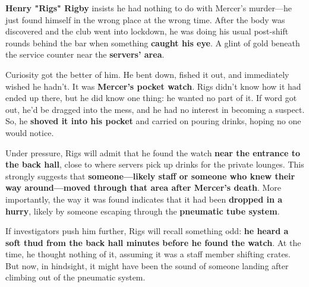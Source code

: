 \begin{WyrdExplanation}
	\textbf{Henry "Rigs" Rigby} insists he had nothing to do with Mercer’s murder—he just found himself in the wrong place at the wrong time. After the body was discovered and the club went into lockdown, he was doing his usual post-shift rounds behind the bar when something \textbf{caught his eye}. A glint of gold beneath the service counter near the \textbf{servers’ area}.  

	Curiosity got the better of him. He bent down, fished it out, and immediately wished he hadn’t. It was \textbf{Mercer’s pocket watch}. Rigs didn’t know how it had ended up there, but he did know one thing: he wanted no part of it. If word got out, he’d be dragged into the mess, and he had no interest in becoming a suspect. So, he \textbf{shoved it into his pocket} and carried on pouring drinks, hoping no one would notice.  

	Under pressure, Rigs will admit that he found the watch \textbf{near the entrance to the back hall}, close to where servers pick up drinks for the private lounges. This strongly suggests that \textbf{someone—likely staff or someone who knew their way around—moved through that area after Mercer’s death}. More importantly, the way it was found indicates that it had been \textbf{dropped in a hurry}, likely by someone escaping through the \textbf{pneumatic tube system}.  

	If investigators push him further, Rigs will recall something odd: \textbf{he heard a soft thud from the back hall minutes before he found the watch}. At the time, he thought nothing of it, assuming it was a staff member shifting crates. But now, in hindsight, it might have been the sound of someone landing after climbing out of the pneumatic system.  
\end{WyrdExplanation}  

